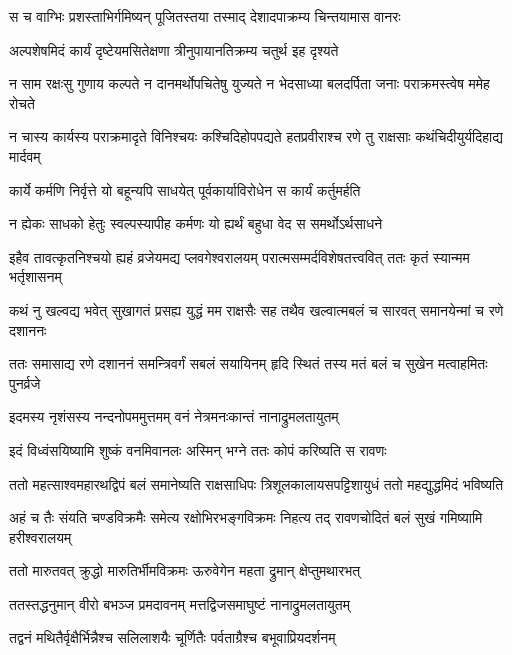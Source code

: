 
\twolineshloka
{स च वाग्भिः प्रशस्ताभिर्गमिष्यन् पूजितस्तया}
{तस्माद् देशादपाक्रम्य चिन्तयामास वानरः} %

\twolineshloka
{अल्पशेषमिदं कार्यं दृष्टेयमसितेक्षणा}
{त्रीनुपायानतिक्रम्य चतुर्थ इह दृश्यते} %

\twolineshloka
{न साम रक्षःसु गुणाय कल्पते न दानमर्थोपचितेषु युज्यते}
{न भेदसाध्या बलदर्पिता जनाः पराक्रमस्त्वेष ममेह रोचते} %

\twolineshloka
{न चास्य कार्यस्य पराक्रमादृते विनिश्चयः कश्चिदिहोपपद्यते}
{हतप्रवीराश्च रणे तु राक्षसाः कथंचिदीयुर्यदिहाद्य मार्दवम्} %

\twolineshloka
{कार्ये कर्मणि निर्वृत्ते यो बहून्यपि साधयेत्}
{पूर्वकार्याविरोधेन स कार्यं कर्तुमर्हति} %

\twolineshloka
{न ह्येकः साधको हेतुः स्वल्पस्यापीह कर्मणः}
{यो ह्यर्थं बहुधा वेद स समर्थोऽर्थसाधने} %

\twolineshloka
{इहैव तावत्कृतनिश्चयो ह्यहं व्रजेयमद्य प्लवगेश्वरालयम्}
{परात्मसम्मर्दविशेषतत्त्ववित् ततः कृतं स्यान्मम भर्तृशासनम्} %

\twolineshloka
{कथं नु खल्वद्य भवेत् सुखागतं प्रसह्य युद्धं मम राक्षसैः सह}
{तथैव खल्वात्मबलं च सारवत् समानयेन्मां च रणे दशाननः} %

\twolineshloka
{ततः समासाद्य रणे दशाननं समन्त्रिवर्गं सबलं सयायिनम्}
{हृदि स्थितं तस्य मतं बलं च सुखेन मत्वाहमितः पुनर्व्रजे} %

\twolineshloka
{इदमस्य नृशंसस्य नन्दनोपममुत्तमम्}
{वनं नेत्रमनःकान्तं नानाद्रुमलतायुतम्} %

\twolineshloka
{इदं विध्वंसयिष्यामि शुष्कं वनमिवानलः}
{अस्मिन् भग्ने ततः कोपं करिष्यति स रावणः} %

\twolineshloka
{ततो महत्साश्वमहारथद्विपं बलं समानेष्यति राक्षसाधिपः}
{त्रिशूलकालायसपट्टिशायुधं ततो महद्युद्धमिदं भविष्यति} %

\twolineshloka
{अहं च तैः संयति चण्डविक्रमैः समेत्य रक्षोभिरभङ्गविक्रमः}
{निहत्य तद् रावणचोदितं बलं सुखं गमिष्यामि हरीश्वरालयम्} %

\twolineshloka
{ततो मारुतवत् क्रुद्धो मारुतिर्भीमविक्रमः}
{ऊरुवेगेन महता द्रुमान् क्षेप्तुमथारभत्} %

\twolineshloka
{ततस्तद्धनुमान् वीरो बभञ्ज प्रमदावनम्}
{मत्तद्विजसमाघुष्टं नानाद्रुमलतायुतम्} %

\twolineshloka
{तद्वनं मथितैर्वृक्षैर्भिन्नैश्च सलिलाशयैः}
{चूर्णितैः पर्वताग्रैश्च बभूवाप्रियदर्शनम्} %

